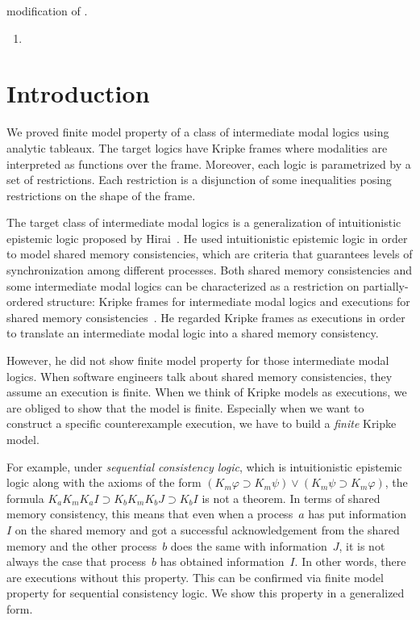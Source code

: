 \documentclass[doctor]{iscs-thesis}
\begin{document}
modification of \citet{sakszaharoglou1999} .

\begin{enumerate}
 \item 
\end{enumerate}

\section{Introduction}

We proved finite model property of a class of intermediate modal logics
using analytic tableaux.
The target logics have Kripke frames where modalities are interpreted as
functions over the frame.  Moreover, each logic is parametrized by a
set of restrictions.  Each restriction is a disjunction of some
inequalities posing restrictions on the shape of the frame.

The target class of intermediate modal logics is a generalization of
intuitionistic epistemic logic proposed by Hirai~\cite{lpar-hirai}.
He used intuitionistic epistemic logic in order to model shared memory
consistencies, which are criteria that guarantees levels of
synchronization among different processes.
Both shared memory consistencies and some intermediate modal logics
can be characterized as a restriction on
partially-ordered structure:
Kripke frames for intermediate modal logics
and executions for shared memory
consistencies~\cite{steinke2004unified}.
He regarded Kripke frames as executions in order to translate
an intermediate modal logic into a shared memory
consistency.

However, he did not show finite model property for those
intermediate modal logics.  When software engineers talk about shared
memory consistencies, they assume an execution is finite.
When we think of Kripke models as executions, we are obliged to show
that the model is finite.
Especially when we want to construct a specific counterexample execution,
we have to build a \textit{finite} Kripke model.

For example,
under \textit{sequential consistency logic}, which is intuitionistic epistemic
logic along with the axioms of the form
$(K_m\varphi\supset K_m\psi) \vee (K_m\psi\supset K_m\varphi)$,
the formula $K_aK_mK_aI \supset K_bK_mK_bJ\supset K_bI$ is not a
theorem.
In terms of shared memory consistency, this means that even when a
process~$a$ has put information~$I$ on the shared memory and got a
successful acknowledgement from the shared memory and the other
process~$b$ does the same with information~$J$, it is not always the
case that process~$b$ has obtained information~$I$\kern -2pt.
In other words, there are executions without this property.
This can be confirmed via
finite model property for sequential consistency logic.
We show this property in a generalized form.
\end{document}
